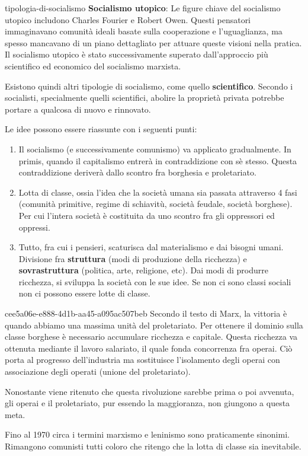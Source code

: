 \documentclass[preview]{standalone}
\begin{document}
\begin{snippet}{tipologia-di-socialismo}
    \textbf{Socialismo utopico}: Le figure chiave del socialismo utopico includono Charles Fourier e Robert Owen.
    Questi pensatori immaginavano comunità ideali basate sulla cooperazione e l'uguaglianza,
    ma spesso mancavano di un piano dettagliato per attuare queste visioni nella pratica.
    Il socialismo utopico è stato successivamente superato dall'approccio più scientifico
    ed economico del socialismo marxista.

    Esistono quindi altri tipologie di socialismo, come quello \textbf{scientifico}.
    Secondo i socialisti, specialmente quelli scientifici, abolire la proprietà privata
    potrebbe portare a qualcosa di nuovo e rinnovato.

    Le idee possono essere riassunte con i seguenti punti:
    \begin{enumerate}
        \item Il socialismo (e successivamente comunismo) va applicato gradualmente. In primis, quando il capitalismo entrerà in contraddizione con sè stesso.
        Questa contraddizione deriverà dallo scontro fra borghesia e proletariato.
        \item Lotta di classe, ossia l'idea che la società umana sia passata attraverso 4 fasi
        (comunità primitive, regime di schiavitù, società feudale, società borghese).
        Per cui l'intera società è costituita da uno scontro fra gli oppressori ed oppressi.
        \item Tutto, fra cui i pensieri, scaturisca dal materialismo e dai bisogni umani.
        Divisione fra \textbf{struttura} (modi di produzione della ricchezza)
        e \textbf{sovrastruttura} (politica, arte, religione, etc).
        Dai modi di produrre ricchezza, si sviluppa la società con le sue idee.
        Se non ci sono classi sociali non ci possono essere lotte di classe.
    \end{enumerate}
\end{snippet}


\begin{snippet}{cee5a06e-e888-4d1b-aa45-a095ac507beb}
    Secondo il testo di Marx, la vittoria è quando abbiamo una massima unità del proletariato.
    Per ottenere il dominio sulla classe borghese è necessario accumulare ricchezza e capitale.
    Questa ricchezza va ottenuta mediante il lavoro salariato, il quale fonda concorrenza fra operai.
    Ciò porta al progresso dell'industria ma sostituisce l'isolamento degli operai con associazione degli operati (unione del proletariato).

    Nonostante viene ritenuto che questa rivoluzione sarebbe prima o poi avvenuta, gli operai e il proletariato,
    pur essendo la maggioranza, non giungono a questa meta.

    Fino al 1970 circa i termini marxismo e leninismo sono praticamente sinonimi.
    Rimangono comunisti tutti coloro che ritengo che la lotta di classe sia inevitabile.
\end{snippet}
\end{document}
